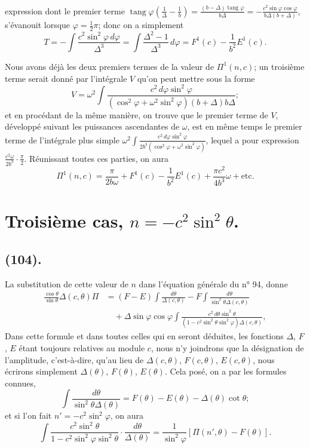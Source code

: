 \documentclass{article}
\begin{document}
expression dont le premier terme $\operatorname{tang}\varphi\left(\frac{1}{\Delta}-\frac{1}{b}\right)=\frac{(b-\Delta)\operatorname{tang}\varphi}{b\Delta}=-\frac{c^{2}\sin\varphi\cos\varphi}{b\Delta(b+\Delta)}$, s'évanouit lorsque $\varphi=\frac{1}{2}\pi$; donc on a simplement
\[ T=-\int\frac{c^{2}\sin^{2}\varphi\,d\varphi}{\Delta^{3}}=\int\frac{\Delta^{2}-1}{\Delta^{3}}\,d\varphi=F^{1}(c)-\frac{1}{b^{2}}E^{1}(c). \]

Nous avons déjà les deux premiers termes de la valeur de $\Pi^{1}(n,c)$; un troisième terme serait donné par l'intégrale $V$ qu'on peut mettre sous la forme
\[ V=\omega^{2}\int\frac{c^{2}\,d\varphi\sin^{2}\varphi}{(\cos^{2}\varphi+\omega^{2}\sin^{2}\varphi)(b+\Delta)b\Delta}; \]
et en procédant de la même manière, on trouve que le premier terme de $V$, développé suivant les puissances ascendantes de $\omega$, est en même temps le premier terme de l'intégrale plus simple $\omega^{2}\displaystyle\int\frac{c^{2}\,d\varphi\sin^{2}\varphi}{2b^{3}(\cos^{2}\varphi+\omega^{2}\sin^{2}\varphi)}$, lequel a pour expression $\frac{c^{2}\omega}{2b^{3}}\cdot\frac{\pi}{2}$. Réunissant toutes ces parties, on aura
\[ \Pi^{1}(n,c)=\frac{\pi}{2b\omega}+F^{1}(c)-\frac{1}{b^{2}}E^{1}(c)+\frac{\pi c^{2}}{4b^{3}}\omega+\text{etc.} \]

\section*{Troisième cas, $n=-c^{2}\sin^{2}\theta$.}

\subsection*{(104).}

La substitution de cette valeur de $n$ dans l'équation générale du n° 94, donne
\[ \begin{aligned} \frac{\cos\theta}{\sin\theta}\Delta(c,\theta)\Pi&=(F-E)\int\frac{d\theta}{\Delta(c,\theta)}-F\int\frac{d\theta}{\sin^{2}\theta\Delta(c,\theta)}\\ &\quad+\Delta\sin\varphi\cos\varphi\int\frac{c^{2}\,d\theta\sin^{2}\theta}{(1-c^{2}\sin^{2}\theta\sin^{2}\varphi)\Delta(c,\theta)}, \end{aligned} \]
Dans cette formule et dans toutes celles qui en seront déduites, les fonctions $\Delta$, $F$, $E$ étant toujours relatives au module $c$, nous n'y joindrons que la désignation de l'amplitude, c'est-à-dire, qu'au lieu de $\Delta(c,\theta)$, $F(c,\theta)$, $E(c,\theta)$, nous écrirons simplement $\Delta(\theta)$, $F(\theta)$, $E(\theta)$. Cela posé, on a par les formules connues,
\[ \int\frac{d\theta}{\sin^{2}\theta\Delta(\theta)}=F(\theta)-E(\theta)-\Delta(\theta)\cot\theta; \]
et si l'on fait $n'=-c^{2}\sin^{2}\varphi$, on aura
\[ \int\frac{c^{2}\sin^{2}\theta}{1-c^{2}\sin^{2}\varphi\sin^{2}\theta}\cdot\frac{d\theta}{\Delta(\theta)}=\frac{1}{\sin^{2}\varphi}[\Pi(n',\theta)-F(\theta)]. \]
\end{document}

